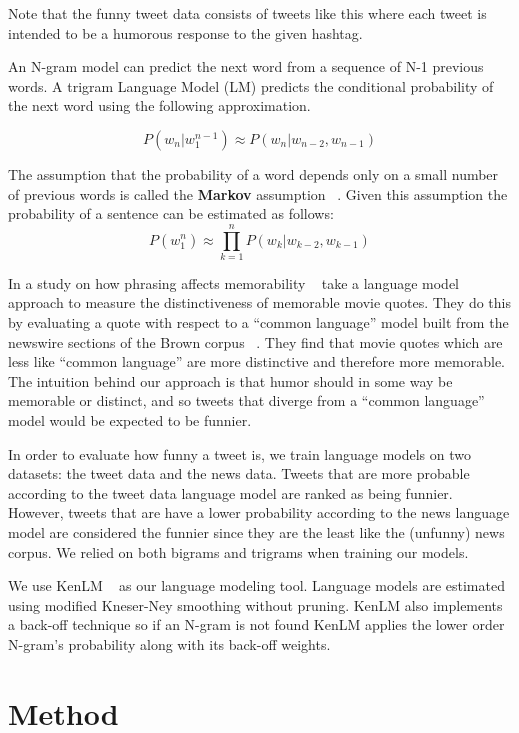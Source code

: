 \documentclass[11pt,a4paper]{article}
\begin{document}
Note that the funny tweet data consists of tweets like this where 
each tweet is intended to be a humorous response to the given hashtag.

An N-gram model can predict the next word from a sequence of N-1 previous words.
A trigram Language Model (LM) predicts the conditional probability of the next word using the following approximation.

\begin{equation}
P(w_n|w_1^{n-1})\approx P(w_n|w_{n-2}, w_{n-1})
\end{equation}

The assumption that the probability of a word depends only on a small number of previous words 
is called the \textbf{Markov} assumption ~\cite{markov1954theory}. Given this assumption 
the probability of a sentence can be estimated as follows:
\begin{equation}
P(w_1^n)\approx \prod_{k=1}^{n} P(w_k|w_{k-2}, w_{k-1})
\end{equation}
 
In a study on how phrasing affects memorability ~\cite{hello} take a language model approach to measure the distinctiveness of
memorable movie quotes. They do this by evaluating a quote with respect to a ``common language'' model built from the newswire sections 
of the Brown corpus ~\cite{BC}. They find that movie quotes which are less like  ``common language'' are more distinctive and therefore
more memorable. The intuition behind our approach is that humor should in some way be memorable or distinct, and so tweets that 
diverge from a ``common language'' model would be expected to be funnier. 

In order to evaluate how funny a tweet is, we train language models on two datasets: 
the tweet data and the news data. 
Tweets that are more probable according to the tweet data language model 
are ranked as being funnier. However, tweets
that are have a lower probability according to the news language 
model are considered the funnier since they are the least like the 
(unfunny) news corpus. We relied on both
bigrams and trigrams when training our models. 

We use KenLM ~\cite{Heafield-estimate} as our language modeling tool. Language models are estimated using modified Kneser-Ney smoothing 
without pruning. KenLM also implements a back-off technique so if an N-gram is not found KenLM applies the lower order N-gram's probability 
along with its back-off weights. 

\section{Method}
\end{document}
